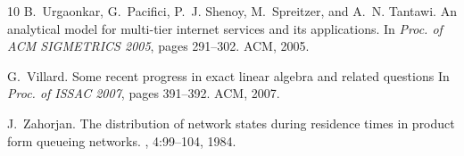 \documentclass[journal,twocolumn,9.5pt]{IEEEtran}
\begin{document}
\begin{thebibliography}{10}
B.~Urgaonkar, G.~Pacifici, P.~J. Shenoy, M.~Spreitzer, and A.~N. Tantawi.
\newblock An analytical model for multi-tier internet services and its
  applications.
\newblock In {\em Proc. of ACM SIGMETRICS 2005}, pages 291--302. ACM, 2005.

G.~Villard.
\newblock Some recent progress in exact linear algebra and related questions
\newblock In {\em Proc. of ISSAC 2007}, pages 391--392. ACM, 2007.


J.~Zahorjan.
\newblock The distribution of network states during residence times in product
  form queueing networks.
, 4:99--104, 1984.

\end{thebibliography}
\end{document}
